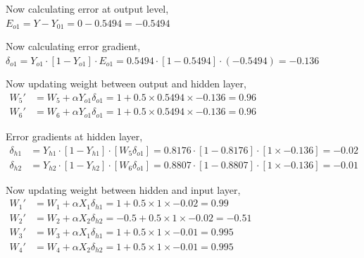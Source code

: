 Now calculating error at output level,\\[0.5em]
$E_{o1} = Y - Y_{01} = 0 - 0.5494 = -0.5494$


Now calculating error gradient,\\[0.5em]
$\delta_{o1} = Y_{o1} \cdot [1-Y_{o1}] \cdot E_{o1} = 0.5494 \cdot [1-0.5494] \cdot (-0.5494) = -0.136$

Now updating weight between output and hidden layer,\\[0.5em]
$\begin{aligned}
   W_5' &= W_5 + \alpha Y_{o1} \delta_{o1} = 1 + 0.5 \times 0.5494 \times -0.136 = 0.96 \\
   W_6' &= W_6 + \alpha Y_{o1} \delta_{o1} = 1 + 0.5 \times 0.5494 \times -0.136 = 0.96
\end{aligned}$

Error gradients at hidden layer,\\[0.5em]
$\begin{aligned}
   \delta_{h1} &= Y_{h1} \cdot [1-Y_{h1}] \cdot \left[W_5\delta_{o1}\right]
   = 0.8176 \cdot [1-0.8176] \cdot \left[1 \times -0.136\right] = -0.02 \\
   \delta_{h2} &= Y_{h2} \cdot [1-Y_{h2}] \cdot \left[W_6\delta_{o1}\right]
   = 0.8807 \cdot [1-0.8807] \cdot \left[1 \times -0.136\right] = -0.01
\end{aligned}$

Now updating weight between hidden and input layer,\\[0.5em]
$\begin{aligned}
   W_1' &= W_1 + \alpha X_1 \delta_{h1} = 1 + 0.5 \times 1 \times -0.02 = 0.99 \\
   W_2' &= W_2 + \alpha X_2 \delta_{h2} = -0.5 + 0.5 \times 1 \times -0.02 = -0.51 \\
   W_3' &= W_3 + \alpha X_1 \delta_{h1} = 1 + 0.5 \times 1 \times -0.01 = 0.995 \\
   W_4' &= W_4 + \alpha X_2 \delta_{h2} = 1 + 0.5 \times 1 \times -0.01 = 0.995
\end{aligned}$